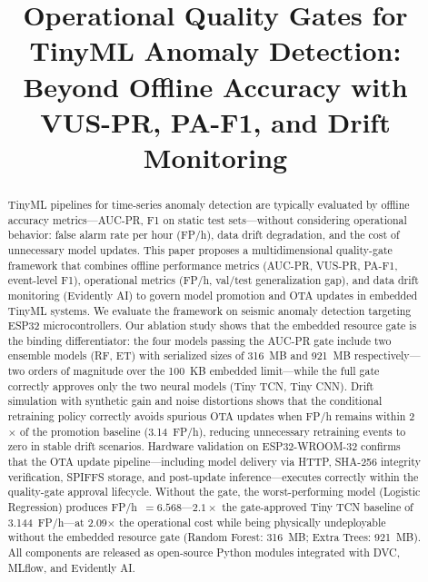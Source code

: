 \documentclass[conference]{IEEEtran}
\def\\{}%
\begin{document}
\title{Operational Quality Gates for TinyML Anomaly Detection:\\
Beyond Offline Accuracy with VUS-PR, PA-F1, and Drift Monitoring}

\author{
  \IEEEauthorblockA{
    \textit{[Department]}\\
    \textit{[Institution]}\\
    [City, Country]\\
    [email]
  }
}

\maketitle

\begin{abstract}
TinyML pipelines for time-series anomaly detection are typically evaluated
by offline accuracy metrics---AUC-PR, F1 on static test sets---without
considering operational behavior: false alarm rate per hour (FP/h),
data drift degradation, and the cost of unnecessary model updates.
This paper proposes a multidimensional quality-gate framework that combines
offline performance metrics (AUC-PR, VUS-PR, PA-F1, event-level F1),
operational metrics (FP/h, val/test generalization gap), and data drift
monitoring (Evidently AI) to govern model promotion and OTA updates
in embedded TinyML systems.
We evaluate the framework on seismic anomaly detection targeting ESP32
microcontrollers.
Our ablation study shows that the embedded resource gate is the binding
differentiator: the four models passing the AUC-PR gate include two ensemble
models (RF, ET) with serialized sizes of 316~MB and 921~MB respectively---two
orders of magnitude over the 100~KB embedded limit---while the full gate
correctly approves only the two neural models (Tiny TCN, Tiny CNN).
Drift simulation with synthetic gain and noise distortions shows that the
conditional retraining policy correctly avoids spurious OTA updates when
FP/h remains within 2$\times$ of the promotion baseline (3.14~FP/h),
reducing unnecessary retraining events to zero in stable drift scenarios.
Hardware validation on ESP32-WROOM-32 confirms that the OTA update
pipeline---including model delivery via HTTP, SHA-256 integrity verification,
SPIFFS storage, and post-update inference---executes correctly within the
quality-gate approval lifecycle.
Without the gate, the worst-performing model (Logistic Regression) produces
FP/h~$=6.568$---$2.1\times$ the gate-approved Tiny TCN baseline of 3.144~FP/h---at
2.09$\times$ the operational cost while being physically undeployable without
the embedded resource gate (Random Forest: 316~MB; Extra Trees: 921~MB).
All components are released as open-source Python modules integrated with
DVC, MLflow, and Evidently AI.
\end{abstract}
\end{document}
